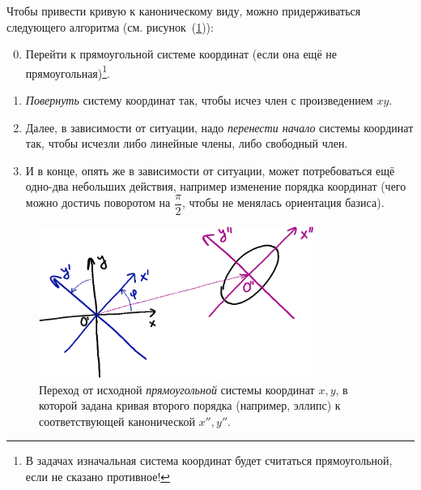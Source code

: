 \documentclass[a4paper,12pt]{article}
\begin{document}
  Чтобы привести кривую к каноническому виду, можно придерживаться следующего алгоритма (см. рисунок~(\ref{fig:from-some-to-canonical})):
  \begin{enumerate}
    \setcounter{enumi}{-1}
    \item Перейти к прямоугольной системе координат (если она ещё не прямоугольная)\footnote{В задачах изначальная система координат будет считаться прямоугольной, если не сказано противное!}.
    \item \emph{Повернуть} систему координат так, чтобы исчез член с произведением $xy$.
    \item Далее, в зависимости от ситуации, надо \emph{перенести начало} системы координат так, чтобы исчезли либо линейные члены, либо свободный член.
    \item И в конце, опять же в зависимости от ситуации, может потребоваться ещё одно-два небольших действия, например изменение порядка координат (чего можно достичь поворотом на $\dfrac{\pi}{2}$, чтобы не менялась ориентация базиса).
  \end{enumerate}
  
  \begin{figure}[h]
    \centering

    \includegraphics[width=0.8\textwidth]{from-some-to-canonical}
  
    \caption{Переход от исходной \emph{прямоугольной} системы координат $x, y$, в которой задана кривая второго порядка (например, эллипс) к соответствующей канонической $x'', y''$.}
    \label{fig:from-some-to-canonical}
  \end{figure}
  
\end{document}

